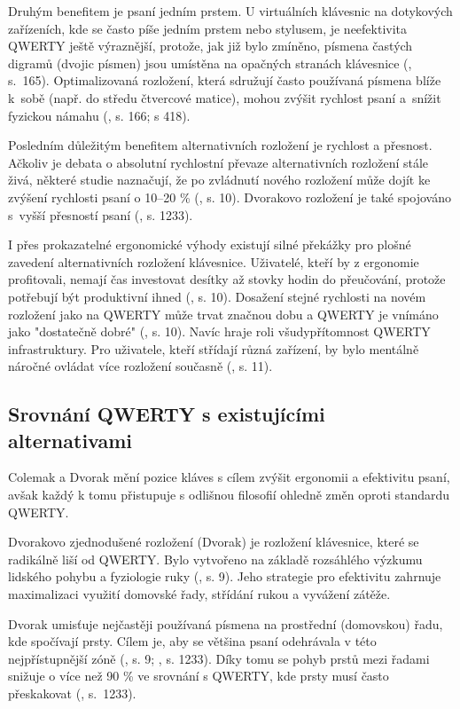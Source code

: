 \documentclass[a4paper, twoside, 12pt, czech]{article}
\begin{document}
Druhým benefitem je psaní jedním prstem. U virtuálních klávesnic na dotykových 
zařízeních, kde se často píše jedním prstem nebo stylusem, je neefektivita 
QWERTY ještě výraznější, protože, jak již bylo zmíněno, písmena častých digramů (dvojic písmen) 
jsou umístěna na opačných stranách klávesnice (\cite{7814594}, s.~165). Optimalizovaná rozložení, 
která sdružují často používaná písmena blíže k~sobě (např. do středu čtvercové 
matice), mohou zvýšit rychlost psaní a~snížit fyzickou námahu (\cite{7814594}, s. 166; \cite{diagramBasedLayout} s 418).

Posledním důležitým benefitem alternativních rozložení je rychlost a přesnost. 
Ačkoliv je debata o absolutní rychlostní převaze alternativních rozložení stále 
živá, některé studie naznačují, že po zvládnutí nového rozložení může dojít ke zvýšení
rychlosti psaní o 10–20 \% (\cite{textEntrySystems}, s. 10). Dvorakovo rozložení je také 
spojováno s~vyšší přesností psaní (\cite{qwerty-dilemma}, s. 1233).


I přes prokazatelné ergonomické výhody existují silné překážky pro plošné zavedení
alternativních rozložení klávesnice.
Uživatelé, kteří by z ergonomie profitovali, nemají čas investovat desítky až 
stovky hodin do přeučování, protože potřebují být produktivní ihned (\cite{textEntrySystems}, s. 10). Dosažení 
stejné rychlosti na novém rozložení jako na QWERTY může trvat značnou dobu a 
QWERTY je vnímáno jako "dostatečně dobré" (\cite{textEntrySystems}, s. 10). Navíc hraje roli všudypří\-tomnost 
QWERTY infrastruktury. Pro uživatele, kteří střídají různá zařízení, by bylo 
mentálně náročné ovládat více rozložení současně (\cite{textEntrySystems}, s. 11).

\subsection{Srovnání QWERTY s existujícími alternativami}
Colemak a Dvorak mění pozice kláves s cílem zvýšit ergonomii a efektivitu psaní, 
avšak každý k tomu přistupuje s odlišnou filosofií ohledně změn oproti standardu 
QWERTY.

Dvorakovo zjednodušené rozložení (Dvorak) je rozložení klávesnice, které se 
radikálně liší od QWERTY. Bylo vytvořeno na základě rozsáhlého výzku\-mu lidského 
pohybu a fyziologie ruky (\cite{textEntrySystems}, s. 9). Jeho strategie pro 
efektivitu zahrnuje maximalizaci využití domovské řady, střídání rukou a vyvážení 
zátěže.

Dvorak umisťuje nejčastěji používaná písmena na prostřední (domovskou) řadu, kde 
spočívají prsty. 
Cílem je, aby se většina psaní odehrávala v této nejpří\-stupnější zóně (\cite{textEntrySystems}, s. 9; \cite{qwerty-dilemma}, s. 1233). 
Díky tomu se pohyb prstů mezi řadami snižuje o více než 90 \% ve srovnání s 
QWERTY, kde prsty musí často přeskakovat (\cite{qwerty-dilemma}, s.~1233).
\end{document}
